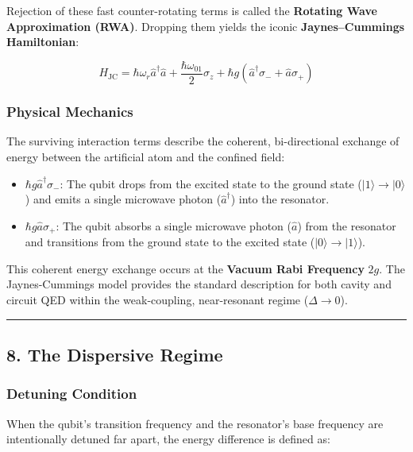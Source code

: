 \documentclass[
]{article}
\providecommand{\tightlist}{%
  \setlength{\itemsep}{0pt}\setlength{\parskip}{0pt}}
\begin{document}
Rejection of these fast counter-rotating terms is called the
\textbf{Rotating Wave Approximation (RWA)}. Dropping them yields the
iconic \textbf{Jaynes--Cummings Hamiltonian}:

\[H_{\text{JC}} = \hbar \omega_r \hat{a}^\dagger \hat{a} + \frac{\hbar \omega_{01}}{2} \sigma_z + \hbar g \left( \hat{a}^\dagger \sigma_- + \hat{a} \sigma_+ \right)\]

\subsubsection{Physical Mechanics}\label{physical-mechanics}

The surviving interaction terms describe the coherent, bi-directional
exchange of energy between the artificial atom and the confined field:

\begin{itemize}
\tightlist
\item
  \(\hbar g \hat{a}^\dagger \sigma_-\): The qubit drops from the excited
  state to the ground state (\(|1\rangle \to |0\rangle\)) and emits a
  single microwave photon (\(\hat{a}^\dagger\)) into the resonator.
\item
  \(\hbar g \hat{a} \sigma_+\): The qubit absorbs a single microwave
  photon (\(\hat{a}\)) from the resonator and transitions from the
  ground state to the excited state (\(|0\rangle \to |1\rangle\)).
\end{itemize}

This coherent energy exchange occurs at the \textbf{Vacuum Rabi
Frequency} \(2g\). The Jaynes-Cummings model provides the standard
description for both cavity and circuit QED within the weak-coupling,
near-resonant regime (\(\Delta \to 0\)).

\begin{center}\rule{0.5\linewidth}{0.5pt}\end{center}

\subsection{8. The Dispersive Regime}\label{the-dispersive-regime}

\subsubsection{Detuning Condition}\label{detuning-condition}

When the qubit's transition frequency and the resonator's base frequency
are intentionally detuned far apart, the energy difference is defined
as:
\end{document}
